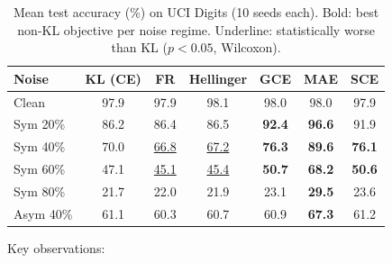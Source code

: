 \documentclass[11pt]{article}
\begin{document}
\begin{table}[t]
  \centering
  \caption{Mean test accuracy (\%) on UCI Digits (10 seeds each).
    Bold: best non-KL objective per noise regime.
    Underline: statistically worse than KL ($p<0.05$, Wilcoxon).}
  \label{tab:accuracy}
  \small
  \begin{tabular}{lcccccc}
    \toprule
    Noise & KL (CE) & FR & Hellinger & GCE & MAE & SCE \\
    \midrule
    Clean    & 97.9 & 97.9 & 98.1 & 98.0 & 98.0 & 97.9 \\
    Sym 20\% & 86.2 & 86.4 & 86.5 & \textbf{92.4} & \textbf{96.6} & 91.9 \\
    Sym 40\% & 70.0 & \underline{66.8} & \underline{67.2} & \textbf{76.3} & \textbf{89.6} & \textbf{76.1} \\
    Sym 60\% & 47.1 & \underline{45.1} & \underline{45.4} & \textbf{50.7} & \textbf{68.2} & \textbf{50.6} \\
    Sym 80\% & 21.7 & 22.0 & 21.9 & 23.1 & \textbf{29.5} & 23.6 \\
    Asym 40\% & 61.1 & 60.3 & 60.7 & 60.9 & \textbf{67.3} & 61.2 \\
    \bottomrule
  \end{tabular}
\end{table}

Key observations:
\end{document}
